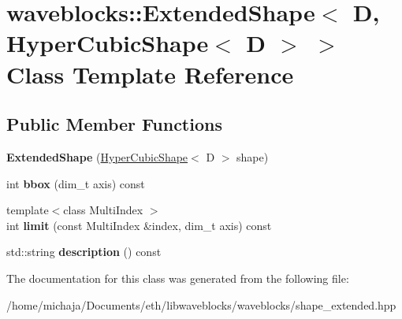 \hypertarget{classwaveblocks_1_1_extended_shape_3_01_d_00_01_hyper_cubic_shape_3_01_d_01_4_01_4}{}\section{waveblocks\+:\+:Extended\+Shape$<$ D, Hyper\+Cubic\+Shape$<$ D $>$ $>$ Class Template Reference}
\label{classwaveblocks_1_1_extended_shape_3_01_d_00_01_hyper_cubic_shape_3_01_d_01_4_01_4}
\subsection*{Public Member Functions}
\begin{DoxyCompactItemize}
\item 
\hypertarget{classwaveblocks_1_1_extended_shape_3_01_d_00_01_hyper_cubic_shape_3_01_d_01_4_01_4_a48712bbf18a9e12f6b2cf937969c6500}{}{\bfseries Extended\+Shape} (\hyperlink{classwaveblocks_1_1_hyper_cubic_shape}{Hyper\+Cubic\+Shape}$<$ D $>$ shape)\label{classwaveblocks_1_1_extended_shape_3_01_d_00_01_hyper_cubic_shape_3_01_d_01_4_01_4_a48712bbf18a9e12f6b2cf937969c6500}

\item 
\hypertarget{classwaveblocks_1_1_extended_shape_3_01_d_00_01_hyper_cubic_shape_3_01_d_01_4_01_4_a9a766abe6fbb571e0ae0c3502c2161dd}{}int {\bfseries bbox} (dim\+\_\+t axis) const \label{classwaveblocks_1_1_extended_shape_3_01_d_00_01_hyper_cubic_shape_3_01_d_01_4_01_4_a9a766abe6fbb571e0ae0c3502c2161dd}

\item 
\hypertarget{classwaveblocks_1_1_extended_shape_3_01_d_00_01_hyper_cubic_shape_3_01_d_01_4_01_4_a18e1f2b340150d1f866f5231d2eadeb0}{}{\footnotesize template$<$class Multi\+Index $>$ }\\int {\bfseries limit} (const Multi\+Index \&index, dim\+\_\+t axis) const \label{classwaveblocks_1_1_extended_shape_3_01_d_00_01_hyper_cubic_shape_3_01_d_01_4_01_4_a18e1f2b340150d1f866f5231d2eadeb0}

\item 
\hypertarget{classwaveblocks_1_1_extended_shape_3_01_d_00_01_hyper_cubic_shape_3_01_d_01_4_01_4_ad1074adb7bd3959cd8461e6b607ace04}{}std\+::string {\bfseries description} () const \label{classwaveblocks_1_1_extended_shape_3_01_d_00_01_hyper_cubic_shape_3_01_d_01_4_01_4_ad1074adb7bd3959cd8461e6b607ace04}

\end{DoxyCompactItemize}


The documentation for this class was generated from the following file\+:\begin{DoxyCompactItemize}
\item 
/home/michaja/\+Documents/eth/libwaveblocks/waveblocks/shape\+\_\+extended.\+hpp\end{DoxyCompactItemize}
